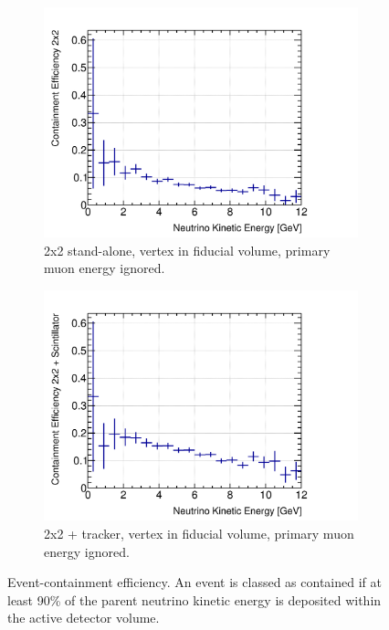 \documentclass[10pt,a4paper,openany]{article}
\begin{document}
\begin{figure}[htbp]
	\centering
	\begin{subfigure}[b]{0.49\textwidth}
		\centering
    \includegraphics[width=1.0\textwidth]{E_cont_eff_2x2_fiducial_gap_no_prim_muon.png}
		\caption{2x2 stand-alone, vertex in fiducial volume, primary muon energy ignored.}
		\label{}
	\end{subfigure}	
	\hfill
	\begin{subfigure}[b]{0.49\textwidth}
		\centering
		\includegraphics[width=1.0\textwidth]{E_cont_eff_2x2_Scintillator_fiducial_gap_no_prim_muon.png}
		\caption{2x2 + tracker, vertex in fiducial volume, primary muon energy ignored.}
		\label{}
	\end{subfigure}	
  \caption{Event-containment efficiency. An event is classed as contained if at least 90\% of the parent neutrino kinetic energy is deposited within the active detector volume.}
\end{figure}
\end{document}

